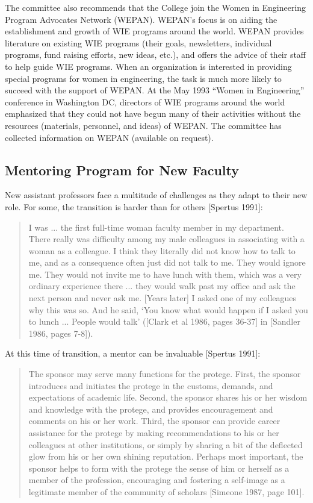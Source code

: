 The committee also recommends that the College join the
Women in Engineering Program Advocates Network (WEPAN).
WEPAN's focus is on aiding the 
establishment and growth of WIE programs around the 
world.  WEPAN provides literature on existing WIE programs (their 
goals, newsletters, individual programs, fund raising efforts, new ideas, 
etc.), and offers the advice of their staff to 
help guide WIE programs.  
When an organization is interested in providing special
programs for women in engineering, the task is much more likely to
succeed with the support of WEPAN. 
At the May 1993
``Women in Engineering'' conference in Washington DC,
  directors of WIE programs
 around the world emphasized that they could not have begun many
of their activities  without the resources (materials,
personnel, and ideas) of WEPAN.
The committee has collected information on WEPAN (available
on request).


\subsection{Mentoring Program for New Faculty}

New assistant professors face a multitude of challenges
as they adapt to their new role.  For some, the transition
is harder than for others [Spertus 1991]:


\begin{quote}
     I was ... the first full-time woman faculty member in
     my department. There really was difficulty among
     my male colleagues in associating with a woman
     as a colleague. I think they literally did not know
     how to talk to me, and as a consequence often just
     did not talk to me. They would ignore me. They
     would not invite me to have lunch with them, which
     was a very ordinary experience there ... they would
     walk past my office and ask the next person and
     never ask me. [Years later] I asked one of my colleagues why this was so. And he said, `You know
     what would happen if I asked you to lunch ... People would talk' ([Clark et al 1986, pages 36-37] in
     [Sandler 1986, pages 7-8]).
\end{quote}

At this time of transition, a mentor can be invaluable
[Spertus 1991]:

\begin{quote}
    The sponsor may serve many functions for the protege.
    First, the sponsor introduces and initiates the protege
    in the customs, demands, and expectations of academic life.  Second, the sponsor shares his or her
    wisdom and knowledge with the protege, and provides encouragement and comments on his or her
    work. Third, the sponsor can provide career assistance for the protege by making recommendations
    to his or her colleagues at other institutions, or simply by sharing a bit of the deflected glow from his
    or her own shining reputation.  Perhaps most important, the sponsor helps to form with the protege
    the sense of him or herself as a member of the profession, encouraging and fostering a self-image as
    a legitimate member of the community of scholars
    [Simeone 1987, page 101].
\end{quote}

